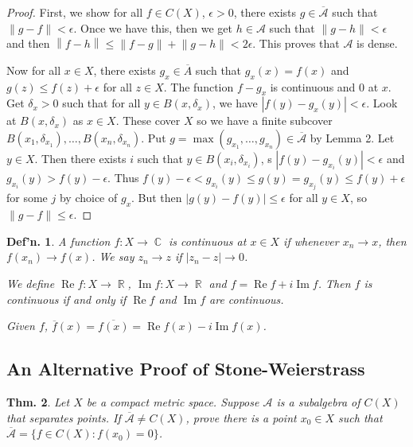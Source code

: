 \documentclass[12pt, a4paper]{book}
\DeclareMathOperator{\R}{\mathbb{R}}
\DeclareMathOperator{\C}{\mathbb{C}}
\renewcommand{\Re}{\ensuremath{\operatorname{Re}}}
\renewcommand{\Im}{\ensuremath{\operatorname{Im}}}
\newcommand{\norm}[1]{\left\lVert#1\right\rVert} %
\newtheorem{theorem}{Thm.}[section]
\newtheorem{definition}[theorem]{Def'n.}
\theoremstyle{nonumberplain}
\newtheorem{proof}{Proof}
\begin{document}
\begin{proof}
    First, we show for all $f\in C(X)$, $\epsilon>0$, there exists $g\in\overline{\mathcal{A}}$ such that $\norm{g-f}<\epsilon$.
    Once we have this, then we get $h\in\mathcal{A}$ such that $\norm{g-h}<\epsilon$ and then $\norm{f-h}\leq\norm{f-g}+\norm{g-h}<2\epsilon$.
    This proves that $\mathcal{A}$ is dense.

    Now for all $x\in X$, there exists $g_x\in\overline{A}$ such that $g_x(x)=f(x)$ and $g(z)\leq f(z)+\epsilon$ for all $z\in X$.
    The function $f-g_x$ is continuous and $0$ at $x$.
    Get $\delta_x>0$ such that for all $y\in B(x,\delta_x)$, we have $|f(y)-g_x(y)|<\epsilon$.
    Look at $B(x,\delta_x)$ as $x\in X$.
    These cover $X$ so we have a finite subcover $B(x_1,\delta_{x_1}),\ldots,B(x_n,\delta_{x_n})$.
    Put $g=\max(g_{x_1},\ldots,g_{x_n})\in\overline{\mathcal{A}}$ by Lemma 2.
    Let $y\in X$.
    Then there exists $i$ such that $y\in B(x_i,\delta_{x_i})$, s $|f(y)-g_{x_i}(y)|<\epsilon$ and $g_{x_i}(y)>f(y)-\epsilon$.
    Thus $f(y)-\epsilon<g_{x_i}(y)\leq g(y)=g_{x_j}(y)\leq f(y)+\epsilon$ for some $j$ by choice of $g_x$.
    But then $|g(y)-f(y)|\leq\epsilon$ for all $y\in X$, so $\norm{g-f}\leq\epsilon$.
\end{proof}
\begin{definition}
    A function $f:X\to\C$ is continuous at $x\in X$ if whenever $x_n\to x$, then $f(x_n)\to f(x)$.
    We say $z_n\to z$ if $|z_n-z|\to 0$.

    We define $\Re f:X\to\R$, $\Im f:X\to\R$ and $f=\Re f+i\Im f$.
    Then $f$ is continuous if and only if $\Re f$ and $\Im f$ are continuous.

    Given $f$, $\overline{f}(x)=\overline{f(x)}=\Re f(x)-i\Im f(x)$.
\end{definition}
\subsection{An Alternative Proof of Stone-Weierstrass}
\begin{theorem}
    Let $X$ be a compact metric space.
    Suppose $\mathcal{A}$ is a subalgebra of $C(X)$ that separates points.
    If $\overline{\mathcal{A}}\neq C(X)$, prove there is a point $x_0\in X$ such that $\overline{\mathcal{A}}=\{f\in C(X):f(x_0)=0\}$.
\end{theorem}
\end{document}
